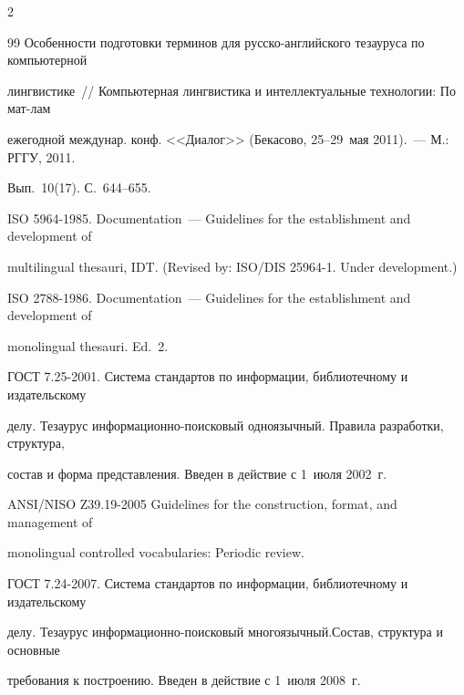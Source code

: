\begin{multicols}{2}
{{\begin{thebibliography}{99}
  Особенности подготовки терминов для русско-английского тезауруса по компьютерной 

лингвистике~// Компьютерная лингвистика и интеллектуальные технологии: По мат-лам 

ежегодной междунар. конф. <<Диалог>> (Бекасово, 25--29~мая 2011).~--- М.: РГГУ, 2011. 

Вып.~10(17). С.~644--655.

  

 


  ISO 5964-1985. Documentation~--- Guidelines for the establishment and development of 

multilingual thesauri, IDT. (Revised by: ISO/DIS 25964-1. Under development.)

  


  ISO 2788-1986. Documentation~--- Guidelines for the establishment and development of 

monolingual thesauri. Ed.~2.

  


  ГОСТ 7.25-2001. Система стандартов по информации, библиотечному и издательскому 

делу. Тезаурус ин\-фор\-мационно-поисковый одноязычный. Правила разработки, структура, 

состав и форма представления. Введен в действие с 1~июля 2002~г.

  


  ANSI/NISO Z39.19-2005 Guidelines for the construction, format, and management of 

monolingual controlled vocabularies: Periodic review.




  ГОСТ 7.24-2007. Система стандартов по информации, библиотечному и издательскому 

делу. Тезаурус информационно-поисковый многоязычный.\linebreak Состав, структура и основные 

требования к по\-стро\-ению. Введен в действие с 1~июля 2008~г.

  




\end{thebibliography}}}
\end{multicols}
